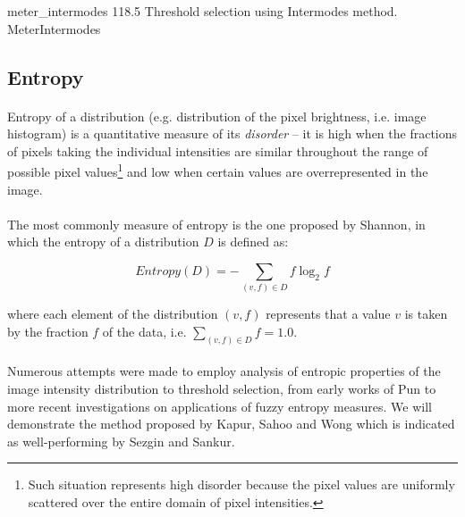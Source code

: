 \thresholdFigure
{meter_intermodes}
{118.5}
{Threshold selection using Intermodes method.}
{MeterIntermodes}




\subsection{Entropy}

\paragraph*{}
Entropy of a distribution (e.g. distribution of the pixel brightness, i.e. image histogram) is a quantitative measure of its \textit{disorder} -- it is high when the fractions of pixels taking the individual intensities are similar throughout the range of possible pixel values\footnote{Such situation represents high disorder because the pixel values are uniformly scattered over the entire domain of pixel intensities.} and low when certain values are overrepresented in the image.

\paragraph*{}
The most commonly measure of entropy is the one proposed by Shannon, in which the entropy of a distribution  $D$ is defined as:

\[
	Entropy(D) = - \sum_{(v,f) \in D}f \log_2{f}
\]

where each element of the distribution $(v,f)$ represents that a value $v$ is taken by the fraction $f$ of the data, i.e. $\sum_{(v,f) \in D} f = 1.0$.

\paragraph*{}
Numerous attempts were made to employ analysis of entropic properties of the image intensity distribution to threshold selection, from early works of Pun to more recent investigations on applications of fuzzy entropy measures. We will demonstrate the method proposed\cite{KapurSahooWong85} by Kapur, Sahoo and Wong which is indicated\cite{SezginSankur04} as well-performing by Sezgin and Sankur.

